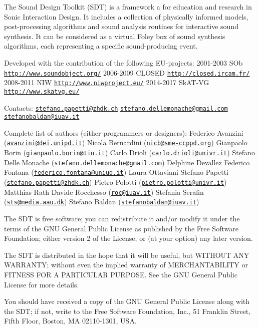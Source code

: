 The \textquotesingle{}Sound Design Toolkit\textquotesingle{} (S\+D\+T) is a framework a for education and research in Sonic Interaction Design. It includes a collection of physically informed models, post-\/processing algorithms and sound analysis routines for interactive sound synthesis. It can be considered as a virtual Foley box of sound synthesis algorithms, each representing a specific sound-\/producing event.

Developed with the contribution of the following E\+U-\/projects\+: 2001-\/2003 \textquotesingle{}S\+Ob\textquotesingle{} \href{http://www.soundobject.org/}{\tt http\+://www.\+soundobject.\+org/} 2006-\/2009 \textquotesingle{}C\+L\+O\+S\+E\+D\textquotesingle{} \href{http://closed.ircam.fr/}{\tt http\+://closed.\+ircam.\+fr/} 2008-\/2011 \textquotesingle{}N\+I\+W\textquotesingle{} \href{http://www.niwproject.eu/}{\tt http\+://www.\+niwproject.\+eu/} 2014-\/2017 \textquotesingle{}Sk\+A\+T-\/\+V\+G \href{http://www.skatvg.eu/}{\tt http\+://www.\+skatvg.\+eu/}

Contacts\+: \href{mailto:stefano.papetti@zhdk.ch}{\tt stefano.\+papetti@zhdk.\+ch} \href{mailto:stefano.dellemonache@gmail.com}{\tt stefano.\+dellemonache@gmail.\+com} \href{mailto:stefanobaldan@iuav.it}{\tt stefanobaldan@iuav.\+it}

Complete list of authors (either programmers or designers)\+: Federico Avanzini (\href{mailto:avanzini@dei.unipd.it}{\tt avanzini@dei.\+unipd.\+it}) Nicola Bernardini (\href{mailto:nicb@sme-ccppd.org}{\tt nicb@sme-\/ccppd.\+org}) Gianpaolo Borin (\href{mailto:gianpaolo.borin@tin.it}{\tt gianpaolo.\+borin@tin.\+it}) Carlo Drioli (\href{mailto:carlo.drioli@univr.it}{\tt carlo.\+drioli@univr.\+it}) Stefano Delle Monache (\href{mailto:stefano.dellemonache@gmail.com}{\tt stefano.\+dellemonache@gmail.\+com}) Delphine Devallez Federico Fontana (\href{mailto:federico.fontana@uniud.it}{\tt federico.\+fontana@uniud.\+it}) Laura Ottaviani Stefano Papetti (\href{mailto:stefano.papetti@zhdk.ch}{\tt stefano.\+papetti@zhdk.\+ch}) Pietro Polotti (\href{mailto:pietro.polotti@univr.it}{\tt pietro.\+polotti@univr.\+it}) Matthias Rath Davide Rocchesso (\href{mailto:roc@iuav.it}{\tt roc@iuav.\+it}) Stefania Serafin (\href{mailto:sts@media.aau.dk}{\tt sts@media.\+aau.\+dk}) Stefano Baldan (\href{mailto:stefanobaldan@iuav.it}{\tt stefanobaldan@iuav.\+it})

The S\+D\+T is free software; you can redistribute it and/or modify it under the terms of the G\+N\+U General Public License as published by the Free Software Foundation; either version 2 of the License, or (at your option) any later version.

The S\+D\+T is distributed in the hope that it will be useful, but W\+I\+T\+H\+O\+U\+T A\+N\+Y W\+A\+R\+R\+A\+N\+T\+Y; without even the implied warranty of M\+E\+R\+C\+H\+A\+N\+T\+A\+B\+I\+L\+I\+T\+Y or F\+I\+T\+N\+E\+S\+S F\+O\+R A P\+A\+R\+T\+I\+C\+U\+L\+A\+R P\+U\+R\+P\+O\+S\+E. See the G\+N\+U General Public License for more details.

You should have received a copy of the G\+N\+U General Public License along with the S\+D\+T; if not, write to the Free Software Foundation, Inc., 51 Franklin Street, Fifth Floor, Boston, M\+A 02110-\/1301, U\+S\+A. 